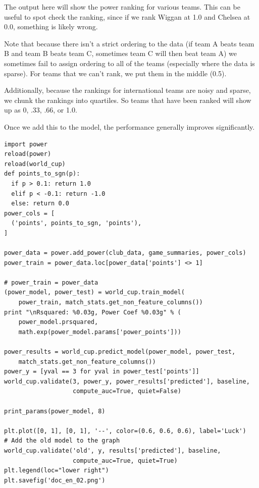 \documentclass[12pt,fleqn]{article}\usepackage{../common}
\begin{document}
The output here will show the power ranking for various teams. This can be
useful to spot check the ranking, since if we rank Wiggan at 1.0 and
Chelsea at 0.0, something is likely wrong.

Note that because there isn't a strict ordering to the data (if team A
beats team B and team B beats team C, sometimes team C will then beat team
A) we sometimes fail to assign ordering to all of the teams (especially
where the data is sparse). For teams that we can't rank, we put them in the
middle (0.5).

Additionally, because the rankings for international teams are noisy and
sparse, we chunk the rankings into quartiles. So teams that have been
ranked will show up as 0, .33, .66, or 1.0.

Once we add this to the model, the performance generally improves significantly.

\begin{verbatim}
import power
reload(power)
reload(world_cup)
def points_to_sgn(p):
  if p > 0.1: return 1.0
  elif p < -0.1: return -1.0
  else: return 0.0
power_cols = [
  ('points', points_to_sgn, 'points'),
]

power_data = power.add_power(club_data, game_summaries, power_cols)
power_train = power_data.loc[power_data['points'] <> 1] 

# power_train = power_data
(power_model, power_test) = world_cup.train_model(
    power_train, match_stats.get_non_feature_columns())
print "\nRsquared: %0.03g, Power Coef %0.03g" % (
    power_model.prsquared, 
    math.exp(power_model.params['power_points']))

power_results = world_cup.predict_model(power_model, power_test, 
    match_stats.get_non_feature_columns())
power_y = [yval == 3 for yval in power_test['points']]
world_cup.validate(3, power_y, power_results['predicted'], baseline, 
                   compute_auc=True, quiet=False)

print_params(power_model, 8)

plt.plot([0, 1], [0, 1], '--', color=(0.6, 0.6, 0.6), label='Luck')
# Add the old model to the graph
world_cup.validate('old', y, results['predicted'], baseline, 
                   compute_auc=True, quiet=True)
plt.legend(loc="lower right")
plt.savefig('doc_en_02.png')
\end{verbatim}
\end{document}
